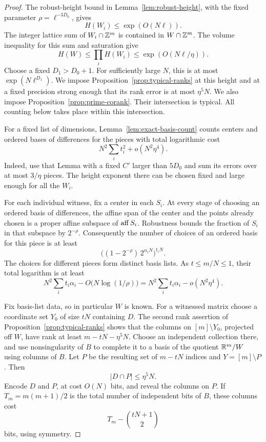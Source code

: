 \begin{proof}
The robust-height bound in Lemma~\ref{lem:robust-height}, with the
fixed parameter \(\rho=\ell^{-3D_0}\), gives
\[
 H(W_i)\le\exp(O(N\ell)).
\]
The integer lattice sum of \(W_i\cap\mathbb Z^m\) is contained in
\(W\cap\mathbb Z^m\). The volume inequality for this sum and saturation give
\[
 H(W)\le\prod_i H(W_i)
       \le\exp(O(N\ell/\eta)).
\]
Choose a fixed \(D_1>D_0+1\). For sufficiently large \(N\), this is at
most \(\exp(N\ell^{D_1})\). We impose
Proposition~\ref{prop:typical-ranks} at this height and at a fixed
precision strong enough that its rank error is at most \(\eta^5N\).
We also impose Proposition~\ref{prop:prime-corank}. Their intersection
is typical. All counting below takes place within this intersection.

For a fixed list of dimensions, Lemma~\ref{lem:exact-basis-count}
counts centers and ordered bases of differences for the pieces with
total logarithmic cost
\begin{equation}\label{eq:witness-basis-upper}
 N^2\sum_i t_i^2+o(N^2\eta^4).
\end{equation}
Indeed, use that Lemma with a fixed \(C'\) larger than \(5D_0\) and
sum its errors over at most \(3/\eta\) pieces. The height exponent
there can be chosen fixed and large enough for all the \(W_i\).

For each individual witness, fix a center in each \(S_i\). At every
stage of choosing an ordered basis of differences, the affine span of
the center and the points already chosen is a proper affine
subspace of \(\operatorname{aff} S_i\). Robustness bounds the fraction of \(S_i\)
in that subspace by \(2^{-\rho}\). Consequently the number of choices
of an ordered basis for this piece is at least
\[
 \bigl((1-2^{-\rho})\,2^{\alpha_iN}\bigr)^{t_iN}.
\]
The choices for different pieces form distinct basis lists. As
\(t\le m/N\le1\), their total logarithm is at least
\begin{equation}\label{eq:witness-basis-lower}
 N^2\sum_i t_i\alpha_i
       -O\bigl(N\log(1/\rho)\bigr)
 =N^2\sum_i t_i\alpha_i-o(N^2\eta^4).
\end{equation}

Fix basis-list data, so in particular \(W\) is known. For a witnessed
matrix choose a coordinate set \(Y_0\) of size \(tN\) containing \(D\).
The second rank assertion of Proposition~\ref{prop:typical-ranks}
shows that the columns on \([m]\setminus Y_0\), projected off \(W\),
have rank at least \(m-tN-\eta^5N\). Choose an independent collection
there, and use nonsingularity of \(B\) to complete it to a basis of
the quotient \(\mathbb R^m/W\) using columns of \(B\). Let \(P\) be the
resulting set of \(m-tN\) indices and \(Y=[m]\setminus P\). Then
\[
 |D\cap P|\le\eta^5N.
\]
Encode \(D\) and \(P\), at cost \(O(N)\) bits, and reveal the columns
on \(P\). If \(T_m=m(m+1)/2\) is the total number of independent bits
of \(B\), these columns cost
\[
 T_m-\binom{tN+1}{2}
\]
bits, using symmetry.


\end{proof}
